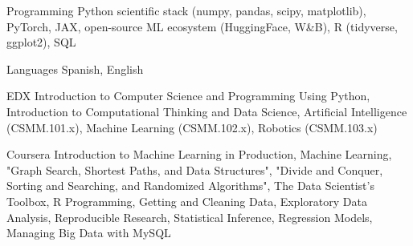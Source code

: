 

\begin{cvskills}




  \cvskill
    {Programming} %
    {Python scientific stack (numpy, pandas, scipy, matplotlib), PyTorch, JAX, open-source ML ecosystem (HuggingFace, W\&B), R (tidyverse, ggplot2), SQL} %

  \cvskill
    {Languages} %
    {Spanish, English} %

  \cvskill
    {EDX} %
    {Introduction to Computer Science and Programming Using Python, Introduction to Computational Thinking and Data Science, Artificial Intelligence (CSMM.101.x), Machine Learning (CSMM.102.x), Robotics (CSMM.103.x)} %

  \cvskill
    {Coursera} %
    {Introduction to Machine Learning in Production, Machine Learning, "Graph Search, Shortest Paths, and Data Structures", "Divide and Conquer, Sorting and Searching, and Randomized Algorithms", The Data Scientist's Toolbox, R Programming, Getting and Cleaning Data, Exploratory Data Analysis, Reproducible Research, Statistical Inference, Regression Models, Managing Big Data with MySQL} %
    
\end{cvskills}
